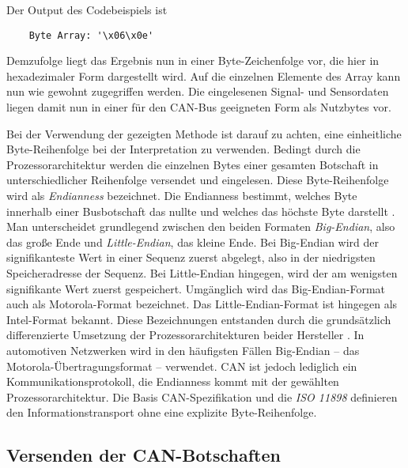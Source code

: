 Der Output des Codebeispiels ist
\begin{addmargin}[1cm]{0cm} 
	\begin{verbatim}
	Byte Array: '\x06\x0e'
	\end{verbatim}
\end{addmargin}

Demzufolge liegt das Ergebnis nun in einer Byte-Zeichenfolge vor, die hier in hexadezimaler Form dargestellt wird. Auf die einzelnen Elemente des Array kann nun wie gewohnt zugegriffen werden. Die eingelesenen Signal- und Sensordaten liegen damit nun in einer für den CAN-Bus geeigneten Form als Nutzbytes vor. 

Bei der Verwendung der gezeigten Methode ist darauf zu achten, eine einheitliche Byte-Reihenfolge bei der Interpretation zu verwenden. Bedingt durch die Prozessorarchitektur werden die einzelnen Bytes einer gesamten Botschaft in unterschiedlicher Reihenfolge versendet und eingelesen. Diese Byte-Reihenfolge wird als \emph{Endianness} bezeichnet. Die Endianness bestimmt, welches Byte innerhalb einer Busbotschaft das nullte und welches das höchste Byte darstellt \cite{FordMotorCompany.2017}. Man unterscheidet grundlegend zwischen den beiden Formaten \emph{Big-Endian}, also das große Ende und \emph{Little-Endian}, das kleine Ende. Bei Big-Endian wird der signifikanteste Wert in einer Sequenz zuerst abgelegt, also in der niedrigsten Speicheradresse der Sequenz. Bei Little-Endian hingegen, wird der am wenigsten signifikante Wert zuerst gespeichert. Umgänglich wird das Big-Endian-Format auch als Motorola-Format bezeichnet. Das Little-Endian-Format ist hingegen als Intel-Format bekannt. Diese Bezeichnungen entstanden durch die grundsätzlich differenzierte Umsetzung der Prozessorarchitekturen beider Hersteller \cite{Rouse.2014}. In automotiven Netzwerken wird in den häufigsten Fällen Big-Endian – das Motorola-Übertragungsformat – verwendet. CAN ist jedoch lediglich ein Kommunikationsprotokoll, die Endianness kommt mit der gewählten Prozessorarchitektur. Die Basis CAN-Spezifikation und die \emph{ISO 11898} definieren den Informationstransport ohne eine explizite Byte-Reihenfolge.


\subsection{Versenden der CAN-Botschaften} \label{subsec:VersendenCAN-Botschaten}

